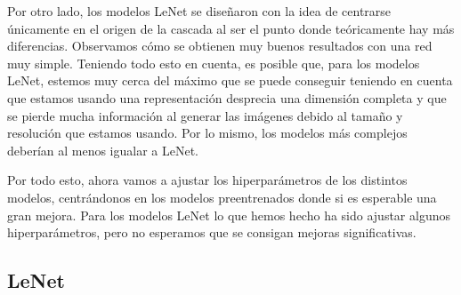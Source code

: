 \documentclass[a4paper,12pt,oneside,titlepage]{book}
\begin{document}
Por otro lado, los modelos LeNet se diseñaron con la idea de centrarse únicamente en el origen de la cascada al ser el punto donde teóricamente hay más diferencias. Observamos cómo se obtienen muy buenos resultados con una red muy simple. Teniendo todo esto en cuenta, es posible que, para los modelos LeNet, estemos muy cerca del máximo que se puede conseguir teniendo en cuenta que estamos usando una representación desprecia una dimensión completa y que se pierde mucha información al generar las imágenes debido al tamaño y resolución que estamos usando. Por lo mismo, los modelos más complejos deberían al menos igualar a LeNet.
 
Por todo esto, ahora vamos a ajustar los hiperparámetros de los distintos modelos, centrándonos en los modelos preentrenados donde si es esperable una gran mejora. Para los modelos LeNet lo que hemos hecho ha sido ajustar algunos hiperparámetros, pero no esperamos que se consigan mejoras significativas.



\subsection*{LeNet}
\end{document}
